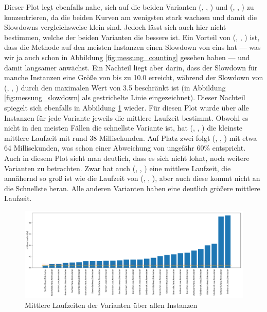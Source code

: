 Dieser Plot legt ebenfalls nahe, sich auf die beiden Varianten (\SeaUSet, \false, \perm) und 
(\SorSor, \true, \distr) zu konzentrieren, da die beiden Kurven am wenigsten stark wachsen und damit 
die Slowdowns vergleichsweise klein sind. Jedoch lässt sich auch hier nicht bestimmen, welche der beiden
Varianten die bessere ist. Ein Vorteil von (\SeaUSet, \false, \perm) ist, 
dass die Methode auf den meisten Instanzen einen Slowdown
von eins hat --- was wir ja auch schon in Abbildung \ref{fig:messung_counting} gesehen haben ---
und damit langsamer anwächst. Ein Nachteil liegt aber darin, dass der Slowdown für manche Instanzen
eine Größe von bis zu 10.0 erreicht, während der Slowdown von  (\SorSor, \true, \distr) durch den maximalen
Wert von 3.5 beschränkt ist (in Abbildung \ref{fig:messung_slowdown} als gestrichelte Linie eingezeichnet).
\newpage
Dieser Nachteil spiegelt sich ebenfalls in Abbildung \ref{fig:messung_mean} wieder. Für diesen Plot
wurde über alle Instanzen für jede Variante jeweils die mittlere Laufzeit bestimmt. Obwohl
es nicht in den meisten Fällen die schnellste Variante ist, hat (\SorSor, \true, \distr) die 
kleinste mittlere Laufzeit mit rund 38 Millisekunden. Auf Platz zwei folgt
(\SeaUSet, \false, \perm) mit etwa 64 Millisekunden, was schon einer Abweichung von ungefähr 60\% entspricht.
Auch in diesem Plot sieht man deutlich, dass es sich nicht lohnt, noch weitere Varianten zu betrachten. Zwar hat 
auch (\SorSor, \true, \perm) eine mittlere Laufzeit, 
die annähernd so groß ist wie die Laufzeit von (\SeaUSet, \false, \perm), aber 
auch diese kommt nicht an die Schnellste heran. Alle anderen Varianten 
haben eine deutlich größere mittlere Laufzeit.
\begin{figure}
\centering
	\includegraphics[width = \textwidth]{figures/mean.pdf}
	\caption{Mittlere Laufzeiten der Varianten über allen Instanzen}
	\label{fig:messung_mean}
\end{figure}
\\

